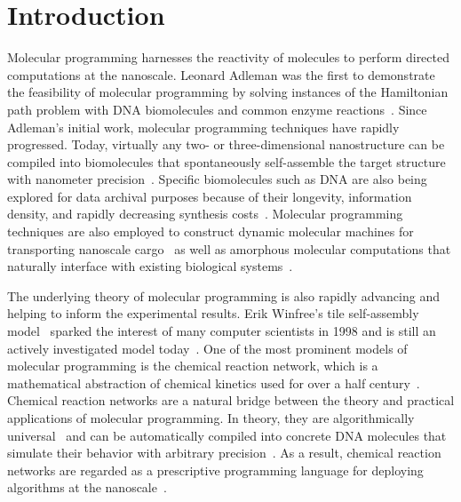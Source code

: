 
\section{Introduction}
Molecular programming harnesses the reactivity of molecules to perform directed computations at the nanoscale.
Leonard Adleman was the first to demonstrate the feasibility of molecular programming by solving instances of the Hamiltonian path problem with DNA biomolecules and common enzyme reactions~\cite{adleman94}.
Since Adleman's initial work, molecular programming techniques have rapidly progressed.
Today, virtually any two- or three-dimensional nanostructure can be compiled into biomolecules that spontaneously self-assemble the target structure with nanometer precision~\cite{jRoth06,jDDLHGS09,jDMTVCS09,jKOSY12,benson2015dna,Juneaav0655}.
Specific biomolecules such as DNA are also being explored for data archival purposes because of their longevity, information density, and rapidly decreasing synthesis costs~\cite{jChGaKo12,jGBCDLSB13,hughes17}.
Molecular programming techniques are also employed to construct dynamic molecular machines for transporting nanoscale cargo~\cite{jShiPie04,jDoBaCh12,jWoodsQian17} as well as amorphous molecular computations that naturally interface with existing biological systems~\cite{cKiHoWi05,jQiaWin11a,jCDSPCS13}.

The underlying theory of molecular programming is also rapidly advancing and helping to inform the experimental results.
Erik Winfree's tile self-assembly model~\cite{oWinf98,jWeDaYi12,qian17} sparked the interest of many computer scientists in 1998 and is still an actively investigated model today~\cite{jLaLuSu09,cDLPSW10,jMeunier17,cFuSuWe19}.
One of the most prominent models of molecular programming is the chemical reaction network, which is a mathematical abstraction of chemical kinetics used for over a half century~\cite{jAris65}.
Chemical reaction networks are a natural bridge between the theory and practical applications of molecular programming.
In theory, they are algorithmically universal~\cite{jSCWB08,cFLBP17} and can be automatically compiled into concrete DNA molecules that simulate their behavior with arbitrary precision~\cite{cSoSeWi09,jLYCP12,jCard13,jCDSPCS13,jSPSWS17,cBSJDTW17}.
As a result, chemical reaction networks are regarded as a prescriptive programming language for deploying algorithms at the nanoscale~\cite{jSCWB08,cSWBG19,jHKLLL18,rdc}.

